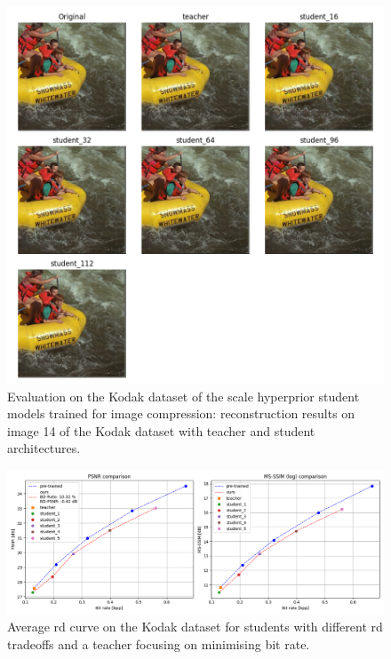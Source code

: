 \begin{figure}
    \centering
    \includegraphics[width=15cm]{../img/kd_lic_kodak_14.png}
    \caption[Evaluation on the Kodak dataset of the scale hyperprior student models trained for image compression: reconstruction results on image 14 of the Kodak dataset with teacher and student architectures.]{Evaluation on the Kodak dataset of the scale hyperprior student models trained for image compression: reconstruction results on image 14 of the Kodak dataset with teacher and student architectures.}
    \label{appendix:kd_lic_2:a}
\end{figure}

\begin{figure}
    \centering
    \includegraphics[width=15cm]{../img/kd_lic_rd_lambda_2.png}
    \caption[Average \acrshort{rd} curve on the Kodak dataset for students with different \acrshort{rd} tradeoffs and a teacher focusing on minimising bit rate.]{Average \acrshort{rd} curve on the Kodak dataset for students with different \acrshort{rd} tradeoffs and a teacher focusing on minimising bit rate.}
    \label{appendix:kd_lic_4_bis}
\end{figure}

